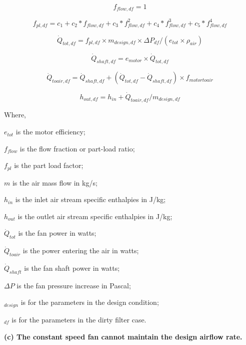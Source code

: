 \begin{equation}
f_{flow,df} = 1
\end{equation}

\begin{equation}
f_{pl,df} = c_{1} + c_{2}*f_{flow,df} + c_{3}*f_{flow,df}^2 + c_{4}*f_{flow,df}^3 + c_{5}*f_{flow,df}^4
\end{equation}

\begin{equation}
\dot{Q}_{tot,df} = f_{pl,df} \times m_{design,df} \times \Delta P_{df} / (e_{tot} \times \rho_{air} )
\end{equation}

\begin{equation}
\dot{Q}_{shaft,df} = e_{motor} \times \dot{Q}_{tot, df}
\end{equation}

\begin{equation}
\dot{Q}_{toair,df} = \dot{Q}_{shaft,df} +( \dot{Q}_{tot,df} - \dot{Q}_{shaft,df}) \times f_{motortoair}
\end{equation}

\begin{equation}
h_{out,df} = h_{in} + \dot{Q}_{toair,df} / m_{design,df}
\end{equation}

Where,

\(e_{tot}\) is the motor efficiency;

\(f_{flow}\) is the flow fraction or part-load ratio;

\(f_{pl}\) is the part load factor;

\(m\) is the air mass flow in kg/s;

\(h_{in}\) is the inlet air stream specific enthalpies in J/kg;

\(h_{out}\) is the outlet air stream specific enthalpies in J/kg;

\(\dot{Q}_{tot}\) is the fan power in watts;

\(\dot{Q}_{toair}\) is the power entering the air in watts;

\(\dot{Q}_{shaft}\) is the fan shaft power in watts;

\(\Delta P\) is the fan pressure increase in Pascal;

\(_{design}\) is for the parameters in the design condition;

\(_{df}\) is for the parameters in the dirty filter case.

\textbf{(c) The constant speed fan cannot maintain the design airflow rate.}

